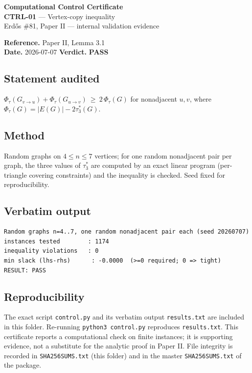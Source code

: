 \documentclass[11pt]{article}
\begin{document}
\begin{center}{\Large\textbf{Computational Control Certificate}}\\[2pt]
{\large \textbf{CTRL-01} --- Vertex-copy inequality}\\[2pt]
Erd\H{o}s \#81, Paper II --- internal validation evidence\\
\end{center}
\vspace{0.3em}
\noindent\textbf{Reference.} Paper II, Lemma 3.1\\
\textbf{Date.} 2026-07-07 \qquad \textbf{Verdict.} \textcolor{pass}{\textbf{PASS}}

\subsection*{Statement audited}
$\Phi_\tau(G_{v\to u})+\Phi_\tau(G_{u\to v})\ \ge\ 2\,\Phi_\tau(G)$ for nonadjacent $u,v$, where $\Phi_\tau(G)=|E(G)|-2\tau_3^*(G)$.

\subsection*{Method}
Random graphs on $4\le n\le 7$ vertices; for one random nonadjacent pair per graph, the three values of $\tau_3^*$ are computed by an exact linear program (per-triangle covering constraints) and the inequality is checked. Seed fixed for reproducibility.

\subsection*{Verbatim output}
\begin{Verbatim}[fontsize=\small,frame=single]
Random graphs n=4..7, one random nonadjacent pair each (seed 20260707)
instances tested        : 1174
inequality violations   : 0
min slack (lhs-rhs)      : -0.0000  (>=0 required; 0 => tight)
RESULT: PASS

\end{Verbatim}

\subsection*{Reproducibility}
The exact script \texttt{control.py} and its verbatim output \texttt{results.txt} are included in this
folder. Re-running \texttt{python3 control.py} reproduces \texttt{results.txt}. This certificate reports a
computational check on finite instances; it is supporting evidence, not a substitute for the analytic
proof in Paper II. File integrity is recorded in \texttt{SHA256SUMS.txt} (this folder) and in the master
\texttt{SHA256SUMS.txt} of the package.
\end{document}
